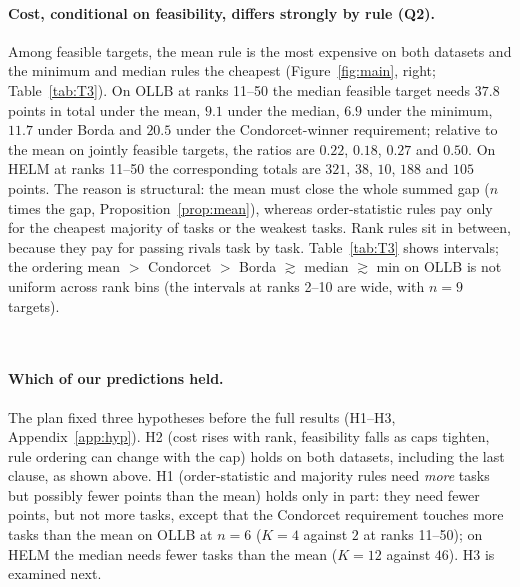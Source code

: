 \documentclass{article}
\begin{document}
\paragraph{Cost, conditional on feasibility, differs strongly by rule (Q2).}
Among feasible targets, the mean rule is the most expensive on both datasets and the minimum and median rules the cheapest (Figure~\ref{fig:main}, right; Table~\ref{tab:T3}). On OLLB at ranks 11--50 the median feasible target needs $37.8$ points in total under the mean, $9.1$ under the median, $6.9$ under the minimum, $11.7$ under Borda and $20.5$ under the Condorcet-winner requirement; relative to the mean on jointly feasible targets, the ratios are $0.22$, $0.18$, $0.27$ and $0.50$. On HELM at ranks 11--50 the corresponding totals are $321$, $38$, $10$, $188$ and $105$ points. The reason is structural: the mean must close the whole summed gap ($n$ times the gap, Proposition~\ref{prop:mean}), whereas order-statistic rules pay only for the cheapest majority of tasks or the weakest tasks. Rank rules sit in between, because they pay for passing rivals task by task. Table~\ref{tab:T3} shows intervals; the ordering mean $>$ Condorcet $>$ Borda $\gtrsim$ median $\gtrsim$ min on OLLB is not uniform across rank bins (the intervals at ranks 2--10 are wide, with $n=9$ targets).

\begin{table}[t]
\caption{Median investment to become first among feasible targets, by rank stratum and rule, primary caps: OLLB (\texttt{emp99}, top) and HELM (\texttt{emp99T}, bottom). ``feas.'' = feasible targets / targets in the stratum; $K$, $L_1$ with 95\% bootstrap intervals over targets; the last column is the median ratio of $L_1$ to the mean rule over targets feasible under both. OLLB Borda and Condorcet use the 50 best targets only. Generated by \texttt{figures/src/tables.py}.}
\label{tab:T3}
\centering\scriptsize
\resizebox{\linewidth}{!}{}\\[4pt]
\resizebox{\linewidth}{!}{}
\end{table}

\paragraph{Which of our predictions held.}
The plan fixed three hypotheses before the full results (H1--H3, Appendix~\ref{app:hyp}). H2 (cost rises with rank, feasibility falls as caps tighten, rule ordering can change with the cap) holds on both datasets, including the last clause, as shown above. H1 (order-statistic and majority rules need \emph{more} tasks but possibly fewer points than the mean) holds only in part: they need fewer points, but not more tasks, except that the Condorcet requirement touches more tasks than the mean on OLLB at $n=6$ ($K=4$ against $2$ at ranks 11--50); on HELM the median needs fewer tasks than the mean ($K=12$ against $46$). H3 is examined next.
\end{document}
